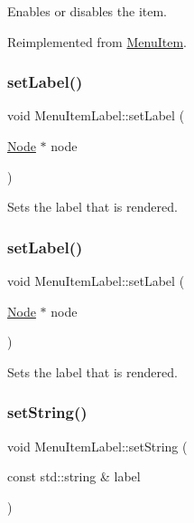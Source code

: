 Enables or disables the item. 

Reimplemented from \hyperlink{classMenuItem_abe370fd6258192233b6bd9534344773b}{Menu\+Item}.

\mbox{\label{classMenuItemLabel_a7aacf61512ed43bff64aebcdd2e8e1c5}} 
\subsubsection{\texorpdfstring{set\+Label()}{setLabel()}\hspace{0.1cm}{\footnotesize\ttfamily [1/2]}}
{\footnotesize\ttfamily void Menu\+Item\+Label\+::set\+Label (\begin{DoxyParamCaption}\item[{\hyperlink{classNode}{Node} $\ast$}]{node }\end{DoxyParamCaption})}

Sets the label that is rendered. \mbox{\label{classMenuItemLabel_a7aacf61512ed43bff64aebcdd2e8e1c5}} 
\subsubsection{\texorpdfstring{set\+Label()}{setLabel()}\hspace{0.1cm}{\footnotesize\ttfamily [2/2]}}
{\footnotesize\ttfamily void Menu\+Item\+Label\+::set\+Label (\begin{DoxyParamCaption}\item[{\hyperlink{classNode}{Node} $\ast$}]{node }\end{DoxyParamCaption})}

Sets the label that is rendered. \mbox{\label{classMenuItemLabel_a792525a9b4ca9f196bb670ec849b7e42}} 
\subsubsection{\texorpdfstring{set\+String()}{setString()}\hspace{0.1cm}{\footnotesize\ttfamily [1/2]}}
{\footnotesize\ttfamily void Menu\+Item\+Label\+::set\+String (\begin{DoxyParamCaption}\item[{const std\+::string \&}]{label }\end{DoxyParamCaption})}

